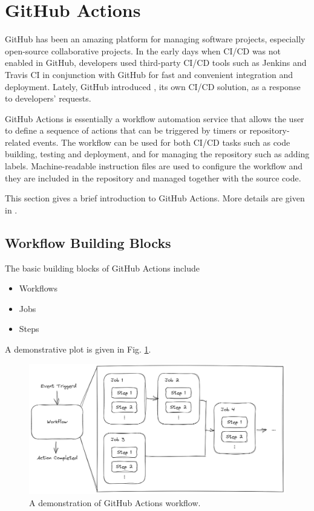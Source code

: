 \section{GitHub Actions}

GitHub has been an amazing platform for managing software projects, especially open-source collaborative projects. In the early days when CI/CD was not enabled in GitHub, developers used third-party CI/CD tools such as Jenkins and Travis CI in conjunction with GitHub for fast and convenient integration and deployment. Lately, GitHub introduced , its own CI/CD solution, as a response to developers' requests.

GitHub Actions is essentially a workflow automation service that allows the user to define a sequence of actions that can be triggered by timers or repository-related events. The workflow can be used for both CI/CD tasks such as code building, testing and deployment, and for managing the repository such as adding labels. Machine-readable instruction files are used to configure the workflow and they are included in the repository and managed together with the source code.

This section gives a brief introduction to GitHub Actions. More details are given in \cite{git2025reference}.

\subsection{Workflow Building Blocks}

The basic building blocks of GitHub Actions include
\begin{itemize}
	\item Workflows
	\item Jobs
	\item Steps
\end{itemize}
A demonstrative plot is given in Fig. \ref{fig:actions_workflow}.
\begin{figure}[!htb]
	\centering
	\includegraphics[width=350pt]{chapters/ap/figures/action_framework.png}
	\caption{A demonstration of GitHub Actions workflow.} \label{fig:actions_workflow}
\end{figure}

